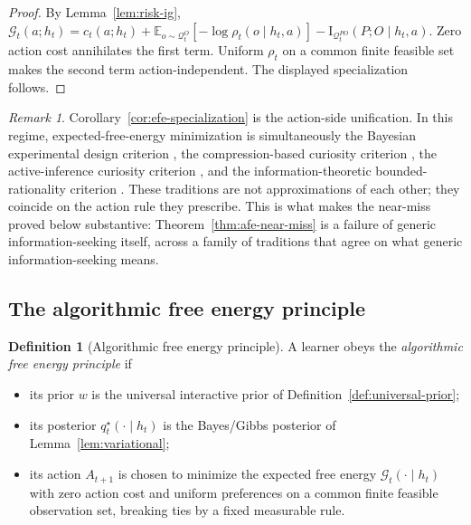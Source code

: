 \documentclass[11pt]{article}
\theoremstyle{definition}
\newtheorem{definition}[theorem]{Definition}
\theoremstyle{remark}
\newtheorem{remark}[theorem]{Remark}
\newcommand{\Gcal}{\mathcal{G}}
\newcommand{\Qcal}{\mathcal{Q}}
\newcommand{\E}{\mathbb{E}}
\newcommand{\I}{\mathrm{I}}
\begin{document}
\begin{proof}
By Lemma~\ref{lem:risk-ig}, $\Gcal_t(a;h_t)=c_t(a;h_t)+\E_{o\sim\Qcal_t^O}[-\log\rho_t(o\mid h_t,a)]-\I_{\Qcal_t^{PO}}(P;O\mid h_t,a)$. Zero action cost annihilates the first term. Uniform $\rho_t$ on a common finite feasible set makes the second term action-independent. The displayed specialization follows.
\end{proof}

\begin{remark}
\label{rem:efe-unification}
Corollary~\ref{cor:efe-specialization} is the action-side unification. In this regime, expected-free-energy minimization is simultaneously the Bayesian experimental design criterion \citep{Lindley1956,ChalonerVerdinelli1995,MacKay1992}, the compression-based curiosity criterion \citep{Schmidhuber1991,Schmidhuber2010}, the active-inference curiosity criterion \citep{FristonEtAl2017Curiosity}, and the information-theoretic bounded-rationality criterion \citep{OrtegaBraun2011,OrtegaBraun2013}. These traditions are not approximations of each other; they coincide on the action rule they prescribe. This is what makes the near-miss proved below substantive: Theorem~\ref{thm:afe-near-miss} is a failure of generic information-seeking itself, across a family of traditions that agree on what generic information-seeking means.
\end{remark}

\subsection{The algorithmic free energy principle}

\begin{definition}[Algorithmic free energy principle]
\label{def:afe-principle}
A learner obeys the \emph{algorithmic free energy principle} if
\begin{itemize}
\item[(i)] its prior $w$ is the universal interactive prior of Definition~\ref{def:universal-prior};
\item[(ii)] its posterior $q_t^\star(\cdot\mid h_t)$ is the Bayes/Gibbs posterior of Lemma~\ref{lem:variational};
\item[(iii)] its action $A_{t+1}$ is chosen to minimize the expected free energy $\Gcal_t(\cdot\mid h_t)$ with zero action cost and uniform preferences on a common finite feasible observation set, breaking ties by a fixed measurable rule.
\end{itemize}
\end{definition}
\end{document}
